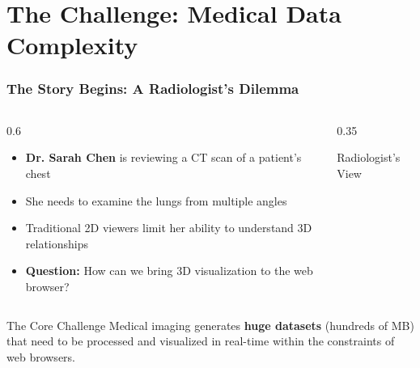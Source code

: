 \section{The Challenge: Medical Data Complexity}

\begin{frame}
\frametitle{The Story Begins: A Radiologist's Dilemma}

\begin{columns}[T]
\begin{column}{0.6\textwidth}
  \begin{itemize}
    \item \textbf{Dr. Sarah Chen} is reviewing a CT scan of a patient's chest
    \item She needs to examine the lungs from multiple angles
    \item Traditional 2D viewers limit her ability to understand 3D relationships
    \item \textbf{Question:} How can we bring 3D visualization to the web browser?
  \end{itemize}
\end{column}
\begin{column}{0.35\textwidth}
  \begin{center}
    \vspace{0.5cm}
    {\small\color{medicalgray}Radiologist's View}
  \end{center}
\end{column}
\end{columns}

\vspace{0.5cm}
\begin{block}{The Core Challenge}
Medical imaging generates \textbf{huge datasets} (hundreds of MB) that need to be processed and visualized in real-time within the constraints of web browsers.
\end{block}
\end{frame}

